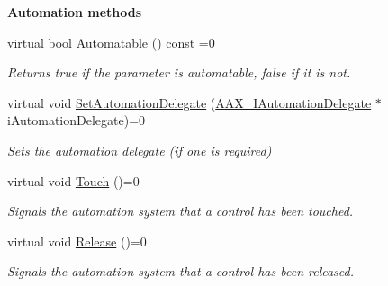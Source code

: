 \begin{Indent}{\bf Automation methods}\par
\begin{DoxyCompactItemize}
\item 
virtual bool \hyperlink{a00108_a253ff336b79cfb454f07d4fa21f2884f}{Automatable} () const =0
\begin{DoxyCompactList}\small\item\em Returns true if the parameter is automatable, false if it is not. \end{DoxyCompactList}\item 
virtual void \hyperlink{a00108_a2c3dfdce09a2652f954ea6e4f9e12797}{Set\+Automation\+Delegate} (\hyperlink{a00086}{A\+A\+X\+\_\+\+I\+Automation\+Delegate} $\ast$i\+Automation\+Delegate)=0
\begin{DoxyCompactList}\small\item\em Sets the automation delegate (if one is required) \end{DoxyCompactList}\item 
virtual void \hyperlink{a00108_a74c71243313f9d817c8bcb77550969aa}{Touch} ()=0
\begin{DoxyCompactList}\small\item\em Signals the automation system that a control has been touched. \end{DoxyCompactList}\item 
virtual void \hyperlink{a00108_a3d4869d9b6ec03d4f95f33f56479756f}{Release} ()=0
\begin{DoxyCompactList}\small\item\em Signals the automation system that a control has been released. \end{DoxyCompactList}\end{DoxyCompactItemize}
\end{Indent}
